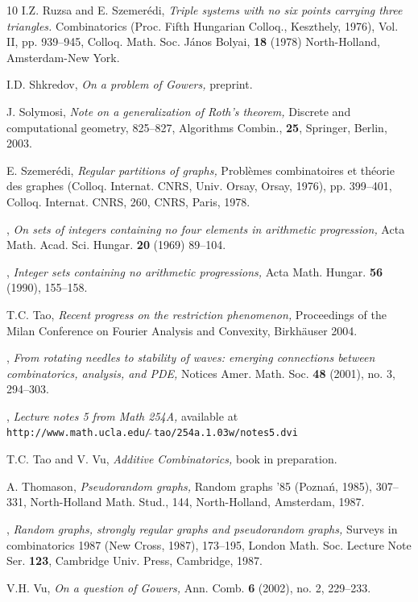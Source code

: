 \documentclass[12pt,a4paper,reqno]{amsart}
\numberwithin{equation}{section}
\theoremstyle{plain}
\theoremstyle{definition}
\begin{document}
\begin{thebibliography}{10}
 I.Z. Ruzsa and E. Szemer\'edi, 
\emph{Triple systems with no six points carrying three triangles. }
Combinatorics (Proc. Fifth Hungarian Colloq., Keszthely, 1976), Vol. II, pp. 939--945, 
Colloq. Math. Soc. J\'anos Bolyai, \textbf{18} (1978) 
North-Holland, Amsterdam-New York.

 I.D. Shkredov, \emph{On a problem of Gowers,} preprint.

 J. Solymosi, \emph{Note on a generalization of Roth's theorem,}
Discrete and computational geometry, 825--827, 
Algorithms Combin., \textbf{25}, 
Springer, Berlin, 2003. 

 E. Szemer\'edi,  \emph{Regular partitions of graphs,} 
Probl\`emes combinatoires et th\'eorie des graphes (Colloq. Internat. CNRS, Univ. Orsay, Orsay, 1976), pp. 399--401, 
Colloq. Internat. CNRS, 260, 
CNRS, Paris, 1978. 

 \bysame, \emph{On sets of integers containing no four elements in arithmetic progression,} Acta Math. Acad. Sci. Hungar. \textbf{20} (1969) 89--104.


 \bysame, \emph{Integer sets containing no arithmetic progressions,} Acta Math. Hungar. \textbf{56} (1990), 155--158.


 T.C. Tao, \emph{Recent progress on the restriction phenomenon,} Proceedings of the Milan Conference on Fourier Analysis and Convexity, Birkh\"auser 2004.

 \bysame, \emph{From rotating needles to stability of waves: emerging connections between combinatorics, analysis, and PDE,} Notices Amer. Math. Soc. \textbf{48} (2001), no. 3, 294--303.


 \bysame, \emph{Lecture notes 5 from Math 254A,} available at\\
\texttt{http://www.math.ucla.edu/$\widetilde{\;}$tao/254a.1.03w/notes5.dvi} 

 T.C. Tao and V. Vu, \emph{Additive Combinatorics,} book in preparation. 

 A. Thomason, \emph{Pseudorandom graphs,} Random graphs '85 (Pozna\'n, 1985), 307--331, North-Holland Math. Stud., 144, North-Holland, Amsterdam, 1987.

 \bysame, \emph{Random graphs, strongly regular graphs and pseudorandom graphs,} Surveys in combinatorics 1987 (New Cross, 1987), 173--195, London Math. Soc. Lecture Note Ser. \textbf{123}, Cambridge Univ. Press, Cambridge, 1987. 

 V.H. Vu, \emph{On a question of Gowers,}
Ann. Comb. \textbf{6} (2002), no. 2, 229--233.



\end{thebibliography}


     
\end{document}
